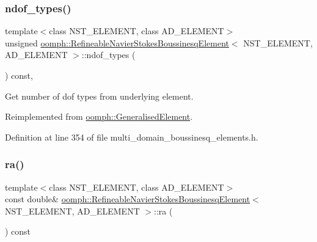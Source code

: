 \mbox{\label{classoomph_1_1RefineableNavierStokesBoussinesqElement_a8e494f3887499d79d8c30c7434494b47}} 
\subsubsection{\texorpdfstring{ndof\+\_\+types()}{ndof\_types()}}
{\footnotesize\ttfamily template$<$class N\+S\+T\+\_\+\+E\+L\+E\+M\+E\+NT, class A\+D\+\_\+\+E\+L\+E\+M\+E\+NT$>$ \\
unsigned \hyperlink{classoomph_1_1RefineableNavierStokesBoussinesqElement}{oomph\+::\+Refineable\+Navier\+Stokes\+Boussinesq\+Element}$<$ N\+S\+T\+\_\+\+E\+L\+E\+M\+E\+NT, A\+D\+\_\+\+E\+L\+E\+M\+E\+NT $>$\+::ndof\+\_\+types (\begin{DoxyParamCaption}{ }\end{DoxyParamCaption}) const\hspace{0.3cm}{\ttfamily [inline]}, {\ttfamily [virtual]}}



Get number of dof types from underlying element. 



Reimplemented from \hyperlink{classoomph_1_1GeneralisedElement_a0c6037a870597b35dcf1c780710b9a56}{oomph\+::\+Generalised\+Element}.



Definition at line 354 of file multi\+\_\+domain\+\_\+boussinesq\+\_\+elements.\+h.

\mbox{\label{classoomph_1_1RefineableNavierStokesBoussinesqElement_ae18350ad83634633acea59b60123d3c0}} 
\subsubsection{\texorpdfstring{ra()}{ra()}}
{\footnotesize\ttfamily template$<$class N\+S\+T\+\_\+\+E\+L\+E\+M\+E\+NT, class A\+D\+\_\+\+E\+L\+E\+M\+E\+NT$>$ \\
const double\& \hyperlink{classoomph_1_1RefineableNavierStokesBoussinesqElement}{oomph\+::\+Refineable\+Navier\+Stokes\+Boussinesq\+Element}$<$ N\+S\+T\+\_\+\+E\+L\+E\+M\+E\+NT, A\+D\+\_\+\+E\+L\+E\+M\+E\+NT $>$\+::ra (\begin{DoxyParamCaption}{ }\end{DoxyParamCaption}) const\hspace{0.3cm}{\ttfamily [inline]}}



